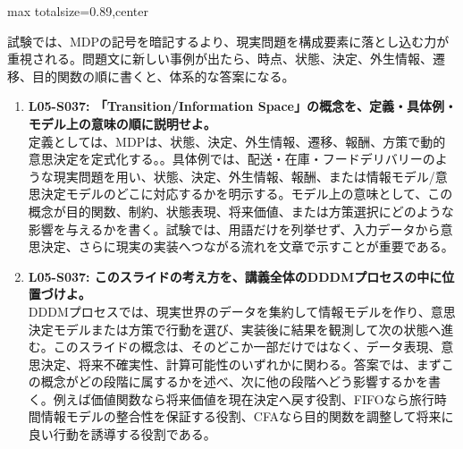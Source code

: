 \begin{minipage}[t]{0.58\textwidth}
\begin{adjustbox}{max totalsize={\textwidth}{0.89\textheight},center}
\begin{minipage}{\textwidth}
試験では、MDPの記号を暗記するより、現実問題を構成要素に落とし込む力が重視される。問題文に新しい事例が出たら、時点、状態、決定、外生情報、遷移、目的関数の順に書くと、体系的な答案になる。\par{}\begin{enumerate}\item \textbf{L05-S037: 「Transition/Information Space」の概念を、定義・具体例・モデル上の意味の順に説明せよ。}\\定義としては、MDPは、状態、決定、外生情報、遷移、報酬、方策で動的意思決定を定式化する。。具体例では、配送・在庫・フードデリバリーのような現実問題を用い、状態、決定、外生情報、報酬、または情報モデル/意思決定モデルのどこに対応するかを明示する。モデル上の意味として、この概念が目的関数、制約、状態表現、将来価値、または方策選択にどのような影響を与えるかを書く。試験では、用語だけを列挙せず、入力データから意思決定、さらに現実の実装へつながる流れを文章で示すことが重要である。\item \textbf{L05-S037: このスライドの考え方を、講義全体のDDDMプロセスの中に位置づけよ。}\\DDDMプロセスでは、現実世界のデータを集約して情報モデルを作り、意思決定モデルまたは方策で行動を選び、実装後に結果を観測して次の状態へ進む。このスライドの概念は、そのどこか一部だけではなく、データ表現、意思決定、将来不確実性、計算可能性のいずれかに関わる。答案では、まずこの概念がどの段階に属するかを述べ、次に他の段階へどう影響するかを書く。例えば価値関数なら将来価値を現在決定へ戻す役割、FIFOなら旅行時間情報モデルの整合性を保証する役割、CFAなら目的関数を調整して将来に良い行動を誘導する役割である。\end{enumerate}
\end{minipage}
\end{adjustbox}
\end{minipage}


